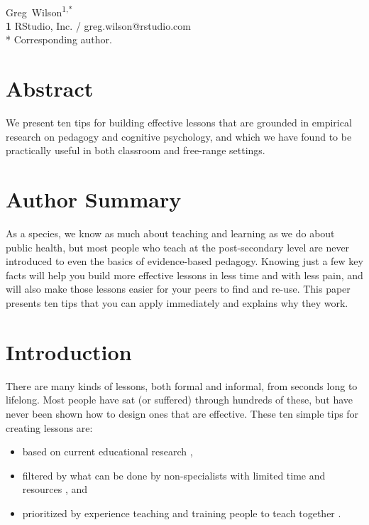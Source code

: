 \documentclass[10pt,letterpaper]{article}
\begin{document}
\vspace*{0.2in}

\begin{flushleft}
{\Large
\textbf{}
}
\newline
\\
{Greg~Wilson}\textsuperscript{1,*}
\\
\textbf{1} RStudio, Inc. / greg.wilson@rstudio.com
\\
\bigskip
* Corresponding author.
\end{flushleft}

\section*{Abstract}

We present ten tips for building effective lessons that are grounded in
empirical research on pedagogy and cognitive psychology, and which we have found
to be practically useful in both classroom and free-range settings.

\section*{Author Summary}

As a species, we know as much about teaching and learning as we do about public
health, but most people who teach at the post-secondary level are never
introduced to even the basics of evidence-based pedagogy.  Knowing just a few
key facts will help you build more effective lessons in less time and with less
pain, and will also make those lessons easier for your peers to find and re-use.
This paper presents ten tips that you can apply immediately and explains why
they work.

\section*{Introduction}

There are many kinds of lessons, both formal and informal, from seconds long to
lifelong.  Most people have sat (or suffered) through hundreds of these, but
have never been shown how to design ones that are effective.  These ten simple
tips for creating lessons are:

\begin{itemize}

\item based on current educational research \cite{Nuth2007,Ambr2010,DeBr2015,Dida2016,Brow2018,Mark2018},

\item filtered by what can be done by non-specialists with limited time and
  resources \cite{Hust2012,Lang2016}, and

\item prioritized by experience teaching and training people to teach together
  \cite{Deve2018,Wils2016,Wils2018}.

\end{itemize}
\end{document}
